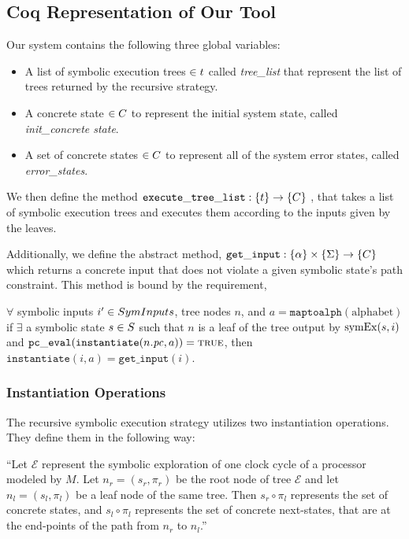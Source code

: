 \subsection{Coq Representation of Our Tool}
Our system contains the following three global variables:
\begin{itemize}
\item A list of symbolic execution trees $\in t$ called \textit{tree\_list} that represent the list of trees returned by the recursive strategy.
\item A concrete state $\in C$ to represent the initial system state, called \textit{init\_concrete state}.
\item A set of concrete states $\in C$ to represent all of the system error states, called \textit{error\_states}.
\end{itemize}

We then define the method $ \mathtt{execute\_tree\_list} : \{t\} \rightarrow \{C\}$ , that takes a list of symbolic execution trees and executes them according to the inputs given by the leaves.

Additionally, we define the abstract method, $ \mathtt{get\_input} : \{\alpha\} \times \{\Sigma\} \rightarrow \{C\}$ which returns a concrete input that does not violate a given symbolic state's path constraint.
This method is bound by the requirement,

\begin{definition}
$ \forall$ symbolic inputs $i' \in SymInputs$, tree nodes $n$, and $a = \mathtt{maptoalph}(\mathrm{alphabet})$
if $\exists$ a symbolic state $s \in S$  such that
$n$ is a leaf of the tree output by $\mathrm{symEx}(s, i)$ and 
$\mathtt{pc\_eval} (\mathtt{instantiate} (n.\mathit{pc}, a)) = \mathtt{\textsc{true}}$, then
$\mathtt{instantiate}(i, a) = \mathtt{get\_input}(i)$.
\end{definition}

\subsubsection{Instantiation Operations}
The recursive symbolic execution strategy utilizes two instantiation operations. 
They define them in the following way: 

``Let $\mathcal{E}$ represent the symbolic exploration of one clock cycle of a processor modeled by $M$. Let $n_r = (s_r,\pi_r)$ be the root node of tree $\mathcal{E}$ and let $n_l = (s_l,\pi_l)$ be a leaf node of the same tree. 
Then $s_r \circ \pi_l$ represents the set of concrete states, and $s_l \circ \pi_l$ represents the set of concrete next-states, that are at the end-points of the path from $n_r$ to $n_l$.'' \cite{zhang2018recursive}

